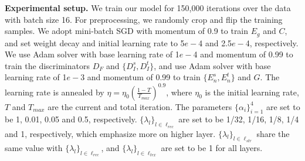 \documentclass[10pt,journal,compsoc,twocolumn ]{IEEEtran}
\begin{document}
\begin{table}
\renewcommand\arraystretch{1.1}
\small
\caption{Ablation study on Oracle-241 dataset. }
\label{ablation}
	\begin{center}
    \end{center}
\end{table}

\textbf{Experimental setup.} We train our model for 150,000 iterations over the data with batch size 16. For preprocessing, we randomly crop and flip the training samples. We adopt mini-batch SGD with momentum of 0.9 to train $E_g$ and $C$, and set weight decay and initial learning rate to 5$e-$4 and 2.5$e-$4, respectively. We use Adam solver with base learning rate of 1$e-$4 and momentum of 0.99 to train the discriminators $D_F$ and $\{D_I^s,D_I^t\}$, and use Adam solver with base learning rate of 1$e-$3 and momentum of 0.99 to train $\{E_n^s, E_n^t\}$ and $G$. The learning rate is annealed by $\eta=\eta_0\left ( \frac{1-T}{T_{max}} \right )^{0.9}$, where $\eta_0$ is the initial learning rate, $T$ and $T_{max}$ are the current and total iteration. The parameters $\{\alpha_i\}_{i=1}^4$ are set to be 1, 0.01, 0.05 and 0.5, respectively. $\{\lambda_l\}_{l\in \ell_{rec}}$ are set to be 1/32, 1/16, 1/8, 1/4 and 1, respectively, which emphasize more on higher layer. $\{\lambda_l\}_{l\in \ell_{str}}$ share the same value with $\{\lambda_l\}_{l\in \ell_{rec}}$, and $\{\lambda_l\}_{l\in \ell_{tex}}$ are set to be 1 for all layers.
\end{document}

